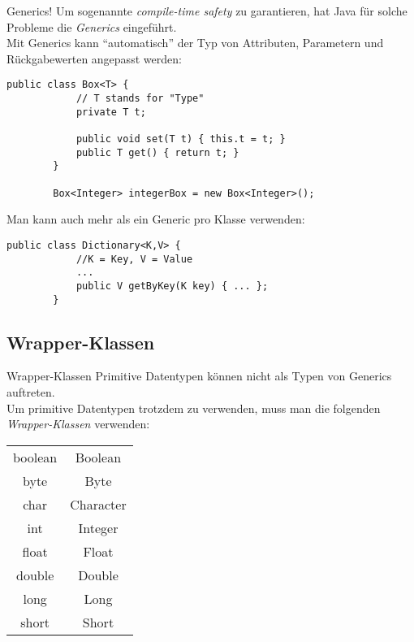\begin{frame}[fragile]{Generics!}
    Um sogenannte \textit{compile-time safety} zu garantieren, hat Java für solche Probleme die \textit{Generics} eingeführt. \\
    Mit Generics kann \enquote{automatisch} der Typ von Attributen, Parametern und Rückgabewerten angepasst werden:
    \begin{lstlisting}[gobble=8,basicstyle=\ttfamily\scriptsize]
        public class Box<T> {
            // T stands for "Type"
            private T t;

            public void set(T t) { this.t = t; }
            public T get() { return t; }
        }

        Box<Integer> integerBox = new Box<Integer>();
    \end{lstlisting}
    Man kann auch mehr als ein Generic pro Klasse verwenden:
    \begin{lstlisting}[gobble=8,basicstyle=\ttfamily\scriptsize]
        public class Dictionary<K,V> {
            //K = Key, V = Value
            ...
            public V getByKey(K key) { ... };
        }
    \end{lstlisting}
\end{frame}

\subsection{Wrapper-Klassen}
\begin{frame}{Wrapper-Klassen}
    Primitive Datentypen können nicht als Typen von Generics auftreten. \\
    Um primitive Datentypen trotzdem zu verwenden, muss man die folgenden \textit{Wrapper-Klassen} verwenden:
    \begin{center}
        \begin{tabular}{ c  c }
            boolean & Boolean \\
            byte & Byte \\
            char & Character \\
            int & Integer \\
            float & Float \\
            double & Double \\
            long & Long \\
            short & Short
        \end{tabular}
    \end{center}
\end{frame}

